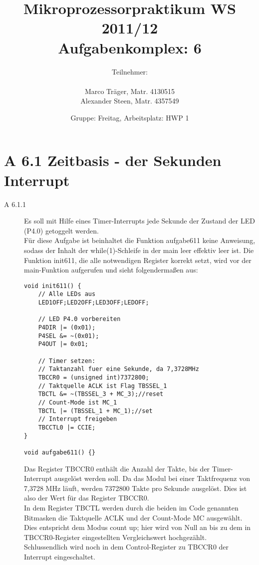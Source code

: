 \documentclass[11pt,a4paper,ngerman]{article}
\author{Teilnehmer:\\ \\Marco Träger, Matr. 4130515\\Alexander Steen, Matr. 4357549}
\date{Gruppe: Freitag, Arbeitsplatz: HWP 1}
\title{Mikroprozessorpraktikum WS 2011/12\\ Aufgabenkomplex: 6}
\begin{document}

\maketitle
\thispagestyle{fancy}
\newpage
\section*{A 6.1 Zeitbasis - der Sekunden Interrupt}

\begin{description}
\item[A 6.1.1] Es soll mit Hilfe eines Timer-Interrupts jede Sekunde der Zustand der LED (P4.0) getoggelt werden. \\

Für diese Aufgabe ist beinhaltet die Funktion aufgabe611 keine Anweisung, sodass der Inhalt der while(1)-Schleife in der main leer effektiv leer ist. Die Funktion init611, die alle notwendigen Register korrekt setzt, wird vor der main-Funktion aufgerufen und sieht folgendermaßen aus:

\begin{lstlisting}
void init611() {
	// Alle LEDs aus
	LED1OFF;LED2OFF;LED3OFF;LEDOFF;
    
    // LED P4.0 vorbereiten
    P4DIR |= (0x01);
    P4SEL &= ~(0x01);
    P4OUT |= 0x01;

    // Timer setzen:
    // Taktanzahl fuer eine Sekunde, da 7,3728MHz
    TBCCR0 = (unsigned int)7372800; 
    // Taktquelle ACLK ist Flag TBSSEL_1
    TBCTL &= ~(TBSSEL_3 + MC_3);//reset 
    // Count-Mode ist MC_1
    TBCTL |= (TBSSEL_1 + MC_1);//set
    // Interrupt freigeben
    TBCCTL0 |= CCIE; 
}

void aufgabe611() {}
\end{lstlisting}

Das Register TBCCR0 enthält die Anzahl der Takte, bis der Timer-Interrupt ausgelöst werden soll. Da das Modul bei einer Taktfrequenz von 7,3728 MHz läuft, werden 7372800 Takte pro Sekunde ausgelöst. Dies ist also der Wert für das Register TBCCR0. \\
In dem Register TBCTL werden durch die beiden im Code genannten Bitmasken die Taktquelle ACLK und der Count-Mode MC ausgewählt. Dies entspricht dem Modus count up; hier wird von Null an bis zu dem in TBCCR0-Register eingestellten Vergleichswert hochgezählt. \\
Schlussendlich wird noch in dem Control-Register zu TBCCR0 der Interrupt eingeschaltet. \\


\end{description}
\end{document}
